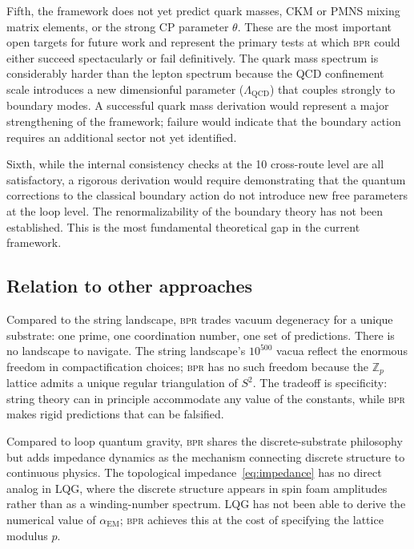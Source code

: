 \documentclass[aps,prd,twocolumn,superscriptaddress,longbibliography,nofootinbib]{revtex4-2}
\newcommand{\Zp}{\mathbb{Z}_p}
\newcommand{\Stwo}{S^2}
\newcommand{\alphaEM}{\alpha_{\mathrm{EM}}}
\newcommand{\bpr}{\textsc{bpr}}
\begin{document}
Fifth, the framework does not yet predict quark masses, CKM or PMNS
mixing matrix elements, or the strong CP parameter $\theta$.  These
are the most important open targets for future work and represent
the primary tests at which \bpr{} could either succeed spectacularly
or fail definitively.  The quark mass spectrum is considerably harder
than the lepton spectrum because the QCD confinement scale introduces
a new dimensionful parameter ($\Lambda_{\mathrm{QCD}}$) that couples
strongly to boundary modes.  A successful quark mass derivation
would represent a major strengthening of the framework; failure would
indicate that the boundary action requires an additional sector not
yet identified.

Sixth, while the internal consistency checks at the 10 cross-route
level are all satisfactory, a rigorous derivation would require
demonstrating that the quantum corrections to the classical boundary
action do not introduce new free parameters at the loop level.
The renormalizability of the boundary theory has not been
established.  This is the most fundamental theoretical gap in the
current framework.

\subsection{Relation to other approaches}

Compared to the string landscape, \bpr{} trades vacuum degeneracy
for a unique substrate: one prime, one coordination number, one set
of predictions.  There is no landscape to navigate.  The string
landscape's $10^{500}$ vacua reflect the enormous freedom in
compactification choices; \bpr{} has no such freedom because the
$\Zp$ lattice admits a unique regular triangulation of $\Stwo$.
The tradeoff is specificity: string theory can in principle
accommodate any value of the constants, while \bpr{} makes rigid
predictions that can be falsified.

Compared to loop quantum gravity, \bpr{} shares the
discrete-substrate philosophy but adds impedance dynamics as the
mechanism connecting discrete structure to continuous physics.  The
topological impedance~\eqref{eq:impedance} has no direct analog in
LQG, where the discrete structure appears in spin foam amplitudes
rather than as a winding-number spectrum.  LQG has not been able to
derive the numerical value of $\alphaEM$; \bpr{} achieves this at
the cost of specifying the lattice modulus $p$.
\end{document}
